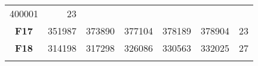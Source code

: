 \documentclass[12pt,a4paper]{article}
\begin{document}
\begin{longtable}[c]{@{}crrrrrr@{}}
\begin{minipage}[t]{0.11\columnwidth}
400001
\strut\end{minipage} &
\begin{minipage}[t]{0.07\columnwidth}\raggedleft\strut
23
\strut\end{minipage}\tabularnewline
\begin{minipage}[t]{0.11\columnwidth}\centering\strut
\textbf{F17}
\strut\end{minipage} &
\begin{minipage}[t]{0.08\columnwidth}\raggedleft\strut
351987
\strut\end{minipage} &
\begin{minipage}[t]{0.08\columnwidth}\raggedleft\strut
373890
\strut\end{minipage} &
\begin{minipage}[t]{0.09\columnwidth}\raggedleft\strut
377104
\strut\end{minipage} &
\begin{minipage}[t]{0.10\columnwidth}\raggedleft\strut
378189
\strut\end{minipage} &
\begin{minipage}[t]{0.11\columnwidth}\raggedleft\strut
378904
\strut\end{minipage} &
\begin{minipage}[t]{0.07\columnwidth}\raggedleft\strut
23
\strut\end{minipage}\tabularnewline
\begin{minipage}[t]{0.11\columnwidth}\centering\strut
\textbf{F18}
\strut\end{minipage} &
\begin{minipage}[t]{0.08\columnwidth}\raggedleft\strut
314198
\strut\end{minipage} &
\begin{minipage}[t]{0.08\columnwidth}\raggedleft\strut
317298
\strut\end{minipage} &
\begin{minipage}[t]{0.09\columnwidth}\raggedleft\strut
326086
\strut\end{minipage} &
\begin{minipage}[t]{0.10\columnwidth}\raggedleft\strut
330563
\strut\end{minipage} &
\begin{minipage}[t]{0.11\columnwidth}\raggedleft\strut
332025
\strut\end{minipage} &
\begin{minipage}[t]{0.07\columnwidth}\raggedleft\strut
27
\strut\end{minipage}\tabularnewline
\begin{minipage}[t]{0.11\columnwidth}\centering\strut

\end{minipage}
\end{longtable}
\end{document}
